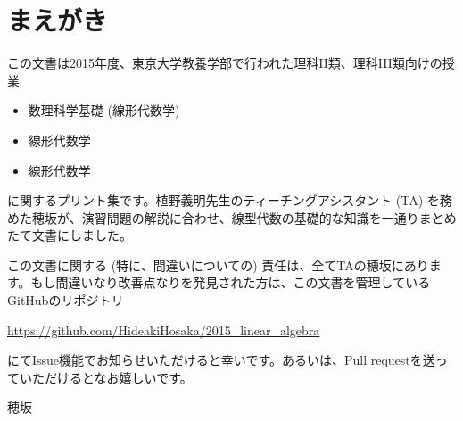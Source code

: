 \section*{まえがき}

この文書は2015年度、東京大学教養学部で行われた理科I\negthinspace I類、理科I\negthinspace I\negthinspace I類向けの授業
\begin{itemize}
\item 数理科学基礎 (線形代数学)
\item 線形代数学
\item 線形代数学
\end{itemize}
に関するプリント集です。植野義明先生のティーチングアシスタント (TA) を務めた穂坂が、演習問題の解説に合わせ、線型代数の基礎的な知識を一通りまとめたて文書にしました。

この文書に関する (特に、間違いについての) 責任は、全てTAの穂坂にあります。もし間違いなり改善点なりを発見された方は、この文書を管理しているGitHubのリポジトリ
\begin{center}
\url{https://github.com/HideakiHosaka/2015_linear_algebra}
\end{center}
にてIssue機能でお知らせいただけると幸いです。あるいは、Pull requestを送っていただけるとなお嬉しいです。

\begin{flushright}
穂坂
\end{flushright}
